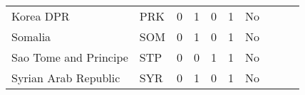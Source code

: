 \begin{singlespace}
{\begin{longtable}{l l c c c c c c c c}
Korea DPR                  & PRK           & 0          & 1                   & 0         & 1                 & No              \\
Somalia                    & SOM           & 0          & 1                   & 0         & 1                 & No              \\
Sao Tome and Principe      & STP           & 0          & 0                   & 1         & 1                 & No              \\
Syrian Arab Republic       & SYR           & 0          & 1                   & 0         & 1                 & No             
\\ \hline \hline
\end{longtable}
}
\endgroup
\end{singlespace}
